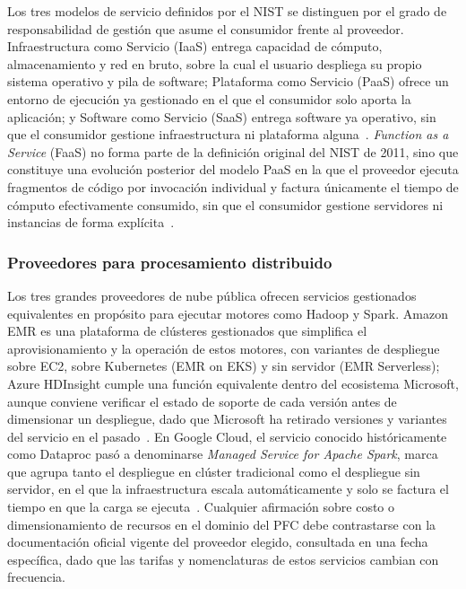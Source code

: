 \documentclass[11pt,a4paper]{article}
\begin{document}
    Los tres modelos de servicio definidos por el NIST se distinguen por
    el grado de responsabilidad de gestión que asume el consumidor frente
    al proveedor. Infraestructura como Servicio (IaaS) entrega capacidad
    de cómputo, almacenamiento y red en bruto, sobre la cual el usuario
    despliega su propio sistema operativo y pila de software; Plataforma
    como Servicio (PaaS) ofrece un entorno de ejecución ya gestionado en
    el que el consumidor solo aporta la aplicación; y Software como
    Servicio (SaaS) entrega software ya operativo, sin que el consumidor
    gestione infraestructura ni plataforma
    alguna~\autocite{mell2011}. \emph{Function as a Service} (FaaS) no forma
    parte de la definición original del NIST de 2011, sino que constituye
    una evolución posterior del modelo PaaS en la que el proveedor ejecuta
    fragmentos de código por invocación individual y factura únicamente
    el tiempo de cómputo efectivamente consumido, sin que el consumidor
    gestione servidores ni instancias de forma
    explícita~\autocite{hassan2021,mell2011}.

    \subsubsection{Proveedores para procesamiento distribuido}

    Los tres grandes proveedores de nube pública ofrecen servicios
    gestionados equivalentes en propósito para ejecutar motores como
    Hadoop y Spark. Amazon EMR es una plataforma de clústeres gestionados
    que simplifica el aprovisionamiento y la operación de estos motores,
    con variantes de despliegue sobre EC2, sobre Kubernetes (EMR on EKS) y
    sin servidor (EMR Serverless); Azure HDInsight cumple una función
    equivalente dentro del ecosistema Microsoft, aunque conviene verificar
    el estado de soporte de cada versión antes de dimensionar un
    despliegue, dado que Microsoft ha retirado versiones y variantes del
    servicio en el pasado~\autocite{poggi2017}. En Google Cloud, el servicio
    conocido históricamente como Dataproc pasó a denominarse
    \emph{Managed Service for Apache Spark}, marca que agrupa tanto el
    despliegue en clúster tradicional como el despliegue sin servidor, en
    el que la infraestructura escala automáticamente y solo se factura el
    tiempo en que la carga se ejecuta~\autocite{poggi2017,hassan2021}.
    Cualquier afirmación sobre costo o dimensionamiento de recursos en el
    dominio del PFC debe contrastarse con la documentación oficial vigente
    del proveedor elegido, consultada en una fecha específica, dado que
    las tarifas y nomenclaturas de estos servicios cambian con
    frecuencia.
\end{document}
